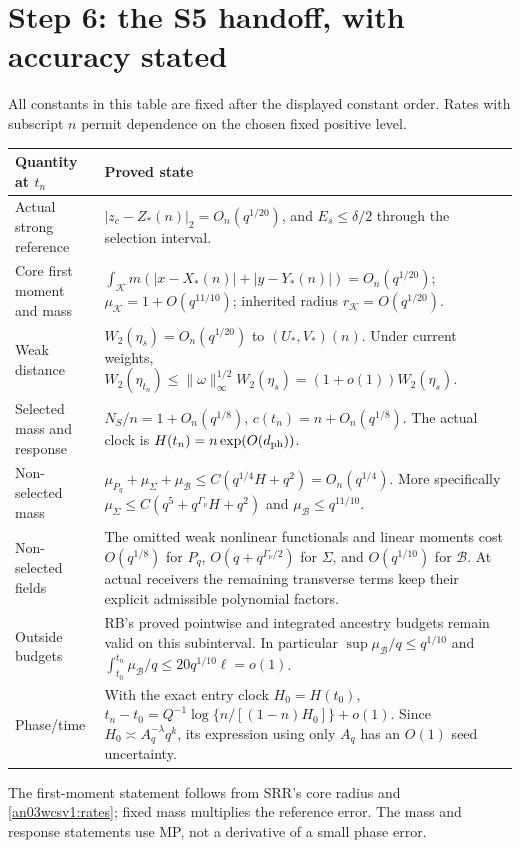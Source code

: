 \documentclass[11pt]{article}
\numberwithin{equation}{section}
\theoremstyle{remark}\newtheorem{remark}[theorem]{Remark}
\newcommand{\KK}{\mathcal K}\newcommand{\BB}{\mathcal B}
\begin{document}
\section{Step 6: the S5 handoff, with accuracy stated}
\label{an03wcsv1:handoff}
All constants in this table are fixed after the displayed constant
order. Rates with subscript $n$ permit dependence on the chosen
fixed positive level.
\begin{longtable}{@{}p{}p{}@{}}
\toprule
Quantity at $t_n$ & Proved state\\ \midrule\endhead
Actual strong reference &
$|z_c-Z_*(n)|_2=O_n(q^{1/20})$, and $E_s\le\delta/2$
through the selection interval.\\
Core first moment and mass &
$\int_\KK m(|x-X_*(n)|+|y-Y_*(n)|)=O_n(q^{1/20})$;
$\mu_\KK=1+O(q^{11/10})$; inherited radius
$r_\KK=O(q^{1/20})$.\\
Weak distance &
$W_2(\eta_s)=O_n(q^{1/20})$ to $(U_*,V_*)(n)$.
Under current weights,
$W_2(\eta_{t_n})\le\|\omega\|_\infty^{1/2}W_2(\eta_s)
=(1+o(1))W_2(\eta_s)$.\\
Selected mass and response &
$N_S/n=1+O_n(q^{1/8})$,
$c(t_n)=n+O_n(q^{1/8})$.
The actual clock is $H(t_n)=n\exp(O(d_{\rm ph}))$.\\
Non-selected mass &
$\mu_{P_q}+\mu_\Sigma+\mu_\BB
\le C(q^{1/4}H+q^2)=O_n(q^{1/4})$.
More specifically
$\mu_\Sigma\le C(q^5+q^{\Gamma_\nu}H+q^2)$
and $\mu_\BB\le q^{11/10}$.\\
Non-selected fields &
The omitted weak nonlinear functionals and linear moments cost
$O(q^{1/8})$ for $P_q$,
$O(q+q^{\Gamma_\nu/2})$ for $\Sigma$,
and $O(q^{1/10})$ for $\BB$.
At actual receivers the remaining transverse terms keep their
explicit admissible polynomial factors.\\
Outside budgets &
RB's proved pointwise and integrated ancestry budgets remain valid
on this subinterval. In particular $\sup\mu_\BB/q\le q^{1/10}$
and $\int_{t_0}^{t_n}\mu_\BB/q\le20q^{1/10}\ell=o(1)$.\\
Phase/time &
With the exact entry clock $H_0=H(t_0)$,
$t_n-t_0=Q^{-1}\log\{n/[(1-n)H_0]\}+o(1)$.
Since $H_0\asymp A_q^{-\lambda}q^k$, its expression using
only $A_q$ has an $O(1)$ seed uncertainty.\\
\bottomrule
\end{longtable}
The first-moment statement follows from SRR's core radius and
\eqref{an03wcsv1:rates}; fixed mass multiplies the reference
error. The mass and response statements use MP, not a derivative
of a small phase error.
\end{document}
